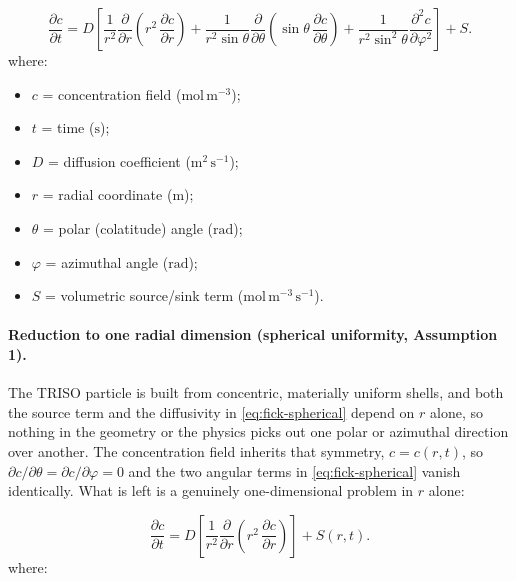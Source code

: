 \documentclass[11pt,a4paper]{article}
\newcommand{\conc}{c}
\newcommand{\pd}[2]{\frac{\partial #1}{\partial #2}}
\newcommand{\pdd}[2]{\frac{\partial^{2} #1}{\partial #2^{2}}}
\newcommand{\Diff}{D}
\begin{document}
\begin{equation}
  \pd{\conc}{t}
  = \Diff \left[
      \frac{1}{r^{2}} \pd{}{r}\!\left( r^{2}\,\pd{\conc}{r} \right)
      + \frac{1}{r^{2}\sin\theta} \pd{}{\theta}\!\left( \sin\theta \, \pd{\conc}{\theta} \right)
      + \frac{1}{r^{2}\sin^{2}\theta} \pdd{\conc}{\varphi}
    \right] + S .
  \label{eq:fick-spherical}
\end{equation}
\vspace{-0.3em}
\noindent where:

\begin{itemize}[leftmargin=1.6em,itemsep=1pt,topsep=3pt,parsep=0pt]
  \item $c$ = concentration field ($\mathrm{mol\,m^{-3}}$);
  \item $t$ = time ($\mathrm{s}$);
  \item $D$ = diffusion coefficient ($\mathrm{m^{2}\,s^{-1}}$);
  \item $r$ = radial coordinate ($\mathrm{m}$);
  \item $\theta$ = polar (colatitude) angle ($\mathrm{rad}$);
  \item $\varphi$ = azimuthal angle ($\mathrm{rad}$);
  \item $S$ = volumetric source/sink term ($\mathrm{mol\,m^{-3}\,s^{-1}}$).
\end{itemize}



\paragraph{Reduction to one radial dimension (spherical uniformity, Assumption 1).}
The TRISO particle is built from concentric, materially uniform shells, and both the source term and the diffusivity in \cref{eq:fick-spherical} depend on $r$ alone, so nothing in the geometry or the physics picks out one polar or azimuthal direction over another. The concentration field inherits that symmetry, $c=c(r,t)$, so $\partial c/\partial\theta=\partial c/\partial\varphi=0$ and the two angular terms in \cref{eq:fick-spherical} vanish identically. What is left is a genuinely one-dimensional problem in $r$ alone:

\begin{equation}
  \pd{\conc}{t}
  = \Diff \left[ \frac{1}{r^{2}} \pd{}{r}\!\left( r^{2}\,\pd{\conc}{r} \right) \right]
  + S(r,t).
  \label{eq:radial-conservative}
\end{equation}
\vspace{-0.3em}
\noindent where:
\end{document}
